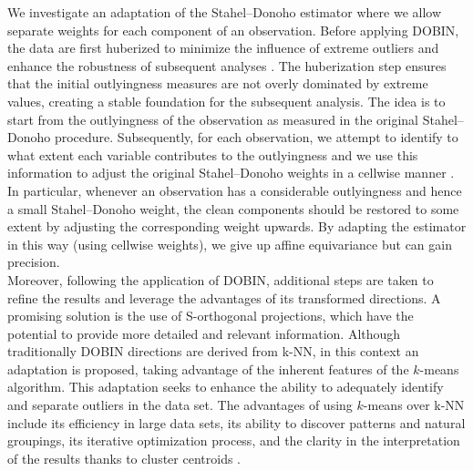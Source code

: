 \documentclass[12pt]{article}
\begin{document}

We investigate an adaptation of the Stahel–Donoho estimator where we allow separate weights for each component of an observation. Before applying DOBIN, the data are first huberized to minimize the influence of extreme outliers and enhance the robustness of subsequent analyses \citep{S.VanAelstandE.VandervierenandG.Willems2012}. The huberization step ensures that the initial outlyingness measures are not overly dominated by extreme values, creating a stable foundation for the subsequent analysis. The idea is to start from the outlyingness of the observation as measured in the original Stahel–Donoho procedure. Subsequently, for each observation, we attempt to identify to what extent each variable contributes to the outlyingness and we use this information to adjust the original Stahel–Donoho weights in a cellwise manner \citep{VanAelst2010}. In particular, whenever an observation has a considerable outlyingness and hence a small Stahel–Donoho weight, the clean components should be restored to some extent by adjusting the corresponding weight upwards. By adapting the estimator in this way (using cellwise weights), we give up affine equivariance but can gain precision.\\ 

Moreover, following the application of DOBIN, additional steps are taken to refine the results and leverage the advantages of its transformed directions. A promising solution is the use of S-orthogonal projections, which have the potential to provide more detailed and relevant information. Although traditionally DOBIN directions are derived from k-NN, in this context an adaptation is proposed, taking advantage of the inherent features of the $k$-means algorithm. This adaptation seeks to enhance the ability to adequately identify and separate outliers in the data set. The advantages of using $k$-means over k-NN include its efficiency in large data sets, its ability to discover patterns and natural groupings, its iterative optimization process, and the clarity in the interpretation of the results thanks to cluster centroids \citep{IKOTUN2023178}.\\
\end{document}
